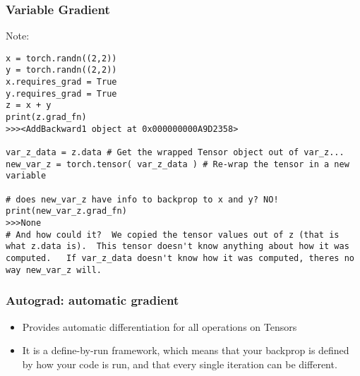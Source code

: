  
\begin{frame}[fragile]
\frametitle{Variable Gradient}
Note:
 \begin{lstlisting}
x = torch.randn((2,2))
y = torch.randn((2,2))
x.requires_grad = True
y.requires_grad = True
z = x + y 
print(z.grad_fn)
>>><AddBackward1 object at 0x000000000A9D2358>

var_z_data = z.data # Get the wrapped Tensor object out of var_z...
new_var_z = torch.tensor( var_z_data ) # Re-wrap the tensor in a new variable

# does new_var_z have info to backprop to x and y? NO!
print(new_var_z.grad_fn)
>>>None
# And how could it?  We copied the tensor values out of z (that is what z.data is).  This tensor doesn't know anything about how it was computed.   If var_z_data doesn't know how it was computed, theres no way new_var_z will.
\end{lstlisting}

\end{frame} 
 

\begin{frame}[fragile] \frametitle{Autograd: automatic gradient}
\begin{itemize}
\item Provides automatic differentiation for all operations on Tensors
\item It is a define-by-run framework, which means that your backprop is defined by how your code is run, and that every single iteration can be different.
\end{itemize}
\end{frame}



